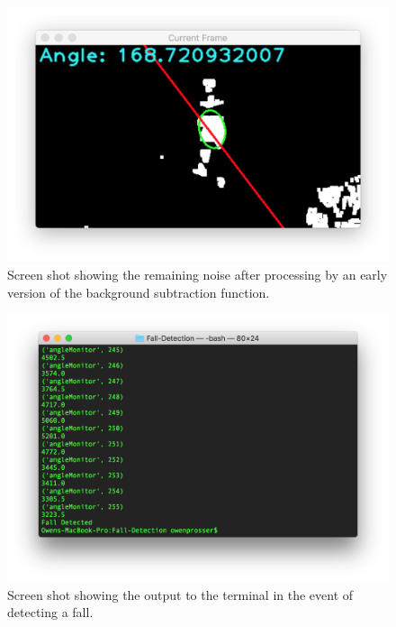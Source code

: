 \documentclass[11pt,a4paper]{report}
\begin{document}
\begin{figure}[H]
 \centering
 \includegraphics[scale = 0.6]{bgSubNoise.png}
 \caption{Screen shot showing the remaining noise after processing by an early version of the background subtraction function.}
 \label{fig:bgSubNoise}
\end{figure}

\begin{figure}[H]
 \centering
 \includegraphics[scale = 0.5]{fallDetectedOutput.png}
 \caption{Screen shot showing the output to the terminal in the event of detecting a fall.}
 \label{fig:fallDetectedOutput}
\end{figure}
\end{document}
